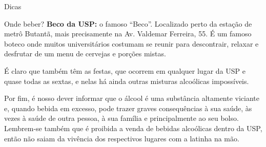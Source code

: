 \begin{secao}{Dicas}
\begin{subsecao}{Onde beber?}
{\bf Beco da USP:} o famoso ``Beco''. Localizado perto da estação de metrô
Butantã, mais precisamente na Av. Valdemar Ferreira, 55. É um famoso boteco onde
muitos universitários costumam se reunir para descontrair, relaxar e desfrutar de
um menu de cervejas e porções mistas.

É claro que também têm as festas, que ocorrem em qualquer lugar da USP e quase
todas as sextas, e nelas há ainda outras misturas alcoólicas impossíveis.

Por fim, é nosso dever informar que o álcool é uma substância altamente viciante
e, quando bebida em excesso, pode trazer graves consequências à sua saúde, às
vezes à saúde de outra pessoa, à sua família e principalmente ao seu bolso.
Lembrem-se também que é proibida a venda de bebidas alcoólicas dentro da USP,
então não saiam da vivência dos respectivos lugares com a latinha na mão.

\end{subsecao}
\end{secao}
